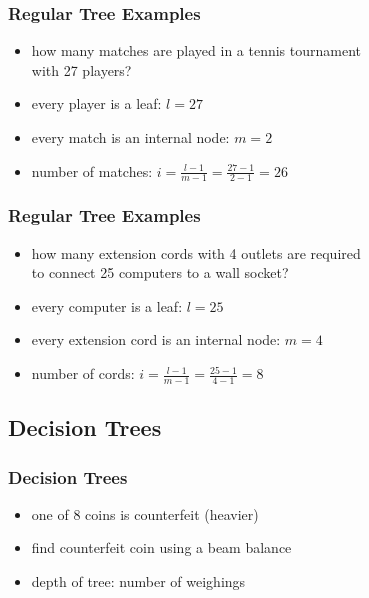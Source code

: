 \documentclass[dvipsnames]{beamer}
\begin{document}
\begin{frame}
  \frametitle{Regular Tree Examples}

  \begin{itemize}
    \item how many matches are played in a tennis tournament\\
      with 27 players?

    \pause
    \bigskip
    \item every player is a leaf: $l = 27$
    \item every match is an internal node: $m = 2$
    \item number of matches: $i = \frac{l - 1}{m - 1} = \frac{27 - 1}{2 - 1} = 26$
  \end{itemize}
\end{frame}

\begin{frame}
  \frametitle{Regular Tree Examples}

  \begin{itemize}
    \item how many extension cords with 4 outlets are required\\
      to connect 25 computers to a wall socket?

    \pause
    \bigskip
    \item every computer is a leaf: $l = 25$
    \item every extension cord is an internal node: $m = 4$
    \item number of cords: $i = \frac{l - 1}{m - 1} = \frac{25 - 1}{4 - 1} = 8$
  \end{itemize}
\end{frame}

\subsection{Decision Trees}


\begin{frame}
  \frametitle{Decision Trees}

  \begin{itemize}
    \item one of 8 coins is counterfeit (heavier)
    \item find counterfeit coin using a beam balance

    \medskip
    \item depth of tree: number of weighings
  \end{itemize}
\end{frame}
\end{document}
